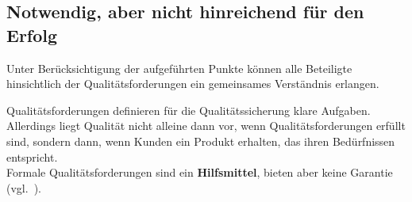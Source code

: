\subsection*{Notwendig, aber nicht hinreichend für den Erfolg}
Unter Berücksichtigung der aufgeführten Punkte können alle Beteiligte hinsichtlich der Qualitätsforderungen ein gemeinsames Verständnis erlangen.

\begin{tcolorbox}[title=Formale Qualitätsforderungen als Hilfsmittel]
    Qualitätsforderungen definieren für die Qualitätssicherung klare Aufgaben.\\
    Allerdings liegt Qualität nicht alleine dann vor, wenn Qualitätsforderungen erfüllt sind, sondern dann, wenn Kunden ein Produkt erhalten, das ihren Bedürfnissen entspricht.\\
    Formale Qualitätsforderungen sind ein \textbf{Hilfsmittel}, bieten aber keine Garantie  (vgl.~\cite[6]{Wed09c}).
\end{tcolorbox}